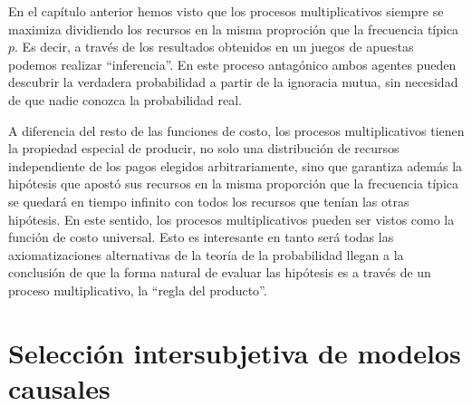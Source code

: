 \documentclass[a4paper,10pt]{book}
\theoremstyle{definition}
\begin{document}

En el capítulo anterior hemos visto que los procesos multiplicativos siempre se maximiza dividiendo los recursos en la misma proproción que la frecuencia típica $p$.
%
Es decir, a través de los resultados obtenidos en un juegos de apuestas podemos realizar ``inferencia''.
% 
En este proceso antagónico ambos agentes pueden descubrir la verdadera probabilidad a partir de la ignoracia mutua, sin necesidad de que nadie conozca la probabilidad real.


A diferencia del resto de las funciones de costo, los procesos multiplicativos tienen la propiedad especial de producir, no solo una distribución de recursos independiente de los pagos elegidos arbitrariamente, sino que garantiza además la hipótesis que apostó sus recursos en la misma proporción que la frecuencia típica se quedará en tiempo infinito con todos los recursos que tenían las otras hipótesis.
%
En este sentido, los procesos multiplicativos pueden ser vistos como la función de costo universal.
%
Esto es interesante en tanto será todas las axiomatizaciones alternativas de la teoría de la probabilidad llegan a la conclusión de que la forma natural de evaluar las hipótesis es a través de un proceso multiplicativo, la ``regla del producto''.

\section{Selección intersubjetiva de modelos causales}\label{sec:modelos_alternativos}
\end{document}
